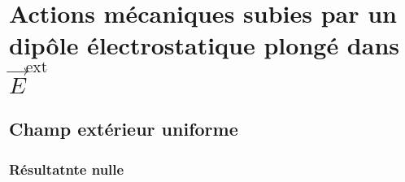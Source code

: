 \section{Actions mécaniques subies par un dipôle électrostatique plongé dans \texorpdfstring{$\vec{E}^{\text{ext}}$}{E}}

\subsection{Champ extérieur uniforme}
\subsubsection{Résultatnte nulle}